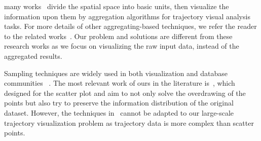 many works~\cite{wood2010visualisation,guo2009flow,von2015mobilitygraphs} divide the {spatial space} into basic units,
then visualize the information upon them by aggregation algorithms for trajectory visual analysis tasks.
For more details of other aggregating-based techniques, we refer the reader to the related works~\cite{andrienko2008spatio,adrienko2010spatial}.
Our problem and solutions are different from these research works as we focus on visualizing the raw input data, instead of the aggregated results.

Sampling techniques are widely used in both visualization and database communities ~\cite{battle2013dynamic,chen2014visual,park2016visualization}.
The most relevant work of ours in the literature is~\cite{park2016visualization}, which designed for the scatter plot and aim to not only solve the overdrawing of the points but also try to preserve the information distribution of the original dataset.
However, the techniques in~\cite{park2016visualization} cannot be adapted to our large-scale trajectory visualization problem
as trajectory data is more complex than scatter points.



